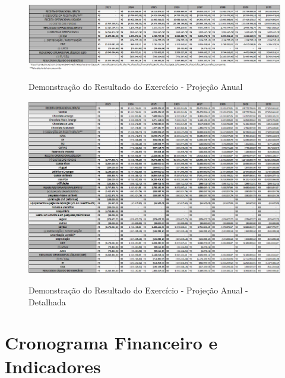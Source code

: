 \documentclass[
	12pt,				%
	openright,			%
	oneside,			%
	a4paper,			%
	english,			%
	french,				%
	spanish,			%
	brazil				%
	]{abntex2}
\begin{document}
\begin{landscape}

\begin{figure}[]
\begin{center}
\caption{Demonstração do Resultado do Exercício - Projeção Anual}
\includegraphics[scale=0.6]{a6.jpeg} 
\label{dre}
\end{center}
\end{figure}

\end{landscape}

\begin{landscape}

\begin{figure}[]
\begin{center}
\caption{Demonstração do Resultado do Exercício - Projeção Anual - Detalhada}
\includegraphics[scale=0.7]{a8.jpeg} 
\label{dre2}
\end{center}
\end{figure}

\end{landscape}

\section{Cronograma Financeiro e Indicadores}
\end{document}

